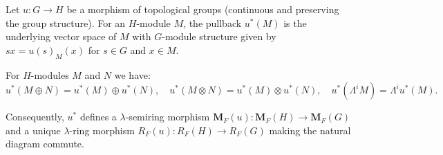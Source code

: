 Let $u: G \rightarrow H$ be a morphism of topological groups (continuous and preserving the group structure). For an $H$-module $M$, the pullback $u^*(M)$ is the underlying vector space of $M$ with $G$-module structure given by $sx = u(s)_M(x)$ for $s \in G$ and $x \in M$.

For $H$-modules $M$ and $N$ we have:
$$u^*(M \oplus N) = u^*(M) \oplus u^*(N), \quad u^*(M \otimes N) = u^*(M) \otimes u^*(N), \quad u^*(\Lambda^i M) = \Lambda^i u^*(M).$$

Consequently, $u^*$ defines a $\lambda$-semiring morphism $\mathbf{M}_F(u): \mathbf{M}_F(H) \rightarrow \mathbf{M}_F(G)$ and a unique $\lambda$-ring morphism $R_F(u): R_F(H) \rightarrow R_F(G)$ making the natural diagram commute.
